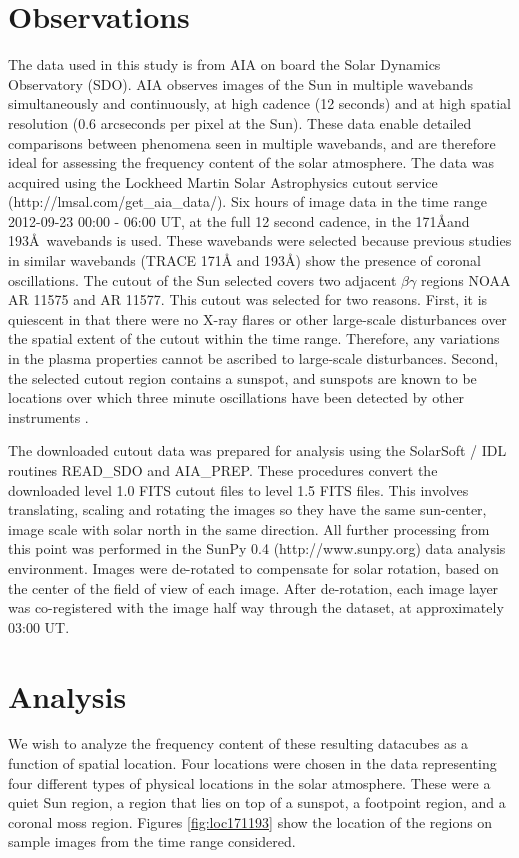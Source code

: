 \documentclass{aastex}
\begin{document}
\section{Observations}\label{sec:obs}
The data used in this study is from AIA on board the Solar Dynamics
Observatory (SDO).  AIA observes images of the Sun in multiple
wavebands simultaneously and continuously, at high cadence (12
seconds) and at high spatial resolution (0.6 arcseconds per pixel at
the Sun).  These data enable detailed comparisons between phenomena
seen in multiple wavebands, and are therefore ideal for assessing the
frequency content of the solar atmosphere.  The data was acquired
using the Lockheed Martin Solar Astrophysics cutout service
(http://lmsal.com/get\_aia\_data/).  Six hours of image data in the
time range 2012-09-23 00:00 - 06:00 UT, at the full 12 second cadence,
in the 171\AA and 193\AA\ wavebands is used.  These wavebands were
selected because previous studies in similar wavebands (TRACE 171\AA
and 193\AA) show the presence of coronal oscillations.  The cutout of
the Sun selected covers two adjacent $\beta\gamma$ regions NOAA AR
11575 and AR 11577.  This cutout was selected for two reasons.  First,
it is quiescent in that there were no X-ray flares or other
large-scale disturbances over the spatial extent of the cutout within
the time range.  Therefore, any variations in the plasma properties
cannot be ascribed to large-scale disturbances.  Second, the selected
cutout region contains a sunspot, and sunspots are known to be
locations over which three minute oscillations have been detected by
other instruments \citep{2002A&A...387L..13D}.

The downloaded cutout data was prepared for analysis using the
SolarSoft / IDL routines READ\_SDO and AIA\_PREP.  These procedures
convert the downloaded level 1.0 FITS cutout files to level 1.5 FITS
files.  This involves translating, scaling and rotating the images so
they have the same sun-center, image scale with solar north in the
same direction.  All further processing from this point was performed
in the SunPy 0.4 (http://www.sunpy.org) data analysis environment.
Images were de-rotated to compensate for solar rotation, based on the
center of the field of view of each image.  After de-rotation, each
image layer was co-registered with the image half way through the
dataset, at approximately 03:00 UT.

\section{Analysis}\label{sec:anal}
We wish to analyze the frequency content of these resulting datacubes
as a function of spatial location.  Four locations were chosen in the
data representing four different types of physical locations in the
solar atmosphere.  These were a quiet Sun region, a region that lies
on top of a sunspot, a footpoint region, and a coronal moss region.
Figures \ref{fig:loc171193} show the location of the regions on sample
images from the time range considered.
\end{document}

